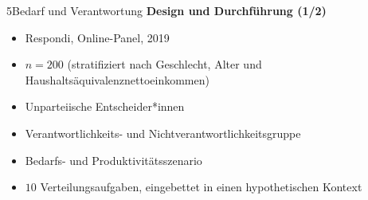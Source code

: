 \documentclass[xcolor=table,9pt,aspectratio=169]{beamer}
\begin{document}
\begin{frame}{\vspace*{10mm}5\hspace*{1em}Bedarf und Verantwortung}
\textbf{Design und Durchführung (1/2)}\\
\medskip
\begin{itemize}
   \item Respondi, Online-Panel, 2019
   \item $n=200$ (stratifiziert nach Geschlecht, Alter und Haushaltsäquivalenznettoeinkommen)
   \item Unparteiische Entscheider*innen
   \item Verantwortlichkeits- und Nichtverantwortlichkeitsgruppe
   \item Bedarfs- und Produktivitätsszenario
   \item $10$ Verteilungsaufgaben, eingebettet in einen hypothetischen Kontext
\end{itemize}
\end{frame}
\end{document}
